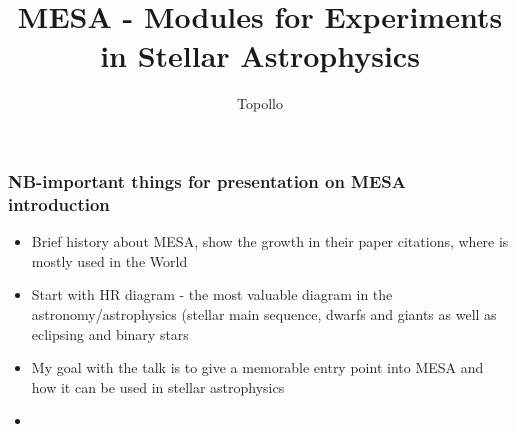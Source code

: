 \documentclass{beamer}
\title{MESA - Modules for Experiments in Stellar Astrophysics}
\author{Topollo}
\begin{document}
\frame{\titlepage}





\frame
{
  \frametitle{NB-important things for presentation on MESA introduction}
\vspace{-0.97cm}
  \begin{itemize}
  \item Brief history about MESA, show the growth in their paper citations, where is mostly used in the World
  \item Start with HR diagram - the most valuable diagram in the astronomy/astrophysics (stellar main sequence, dwarfs and giants as well as eclipsing and binary stars
  \item  My goal with the talk is to give a memorable entry point into MESA and how it can be used in stellar astrophysics
  \item 
  \end{itemize}
}
\end{document}
